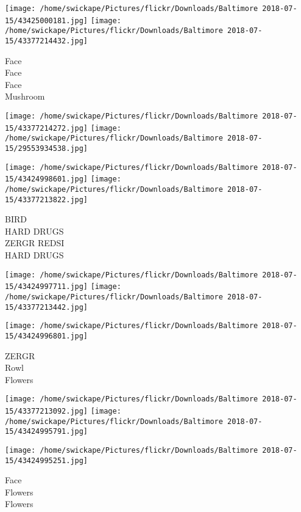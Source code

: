\documentclass[10pt,letterpaper]{article}
\begin{document}
\texttt{[image: /home/swickape/Pictures/flickr/Downloads/Baltimore 2018-07-15/43425000181.jpg]}
\texttt{[image: /home/swickape/Pictures/flickr/Downloads/Baltimore 2018-07-15/43377214432.jpg]}

Face\\
Face\\
Face\\
Mushroom\\
\pagebreak

\texttt{[image: /home/swickape/Pictures/flickr/Downloads/Baltimore 2018-07-15/43377214272.jpg]}
\texttt{[image: /home/swickape/Pictures/flickr/Downloads/Baltimore 2018-07-15/29553934538.jpg]}

\texttt{[image: /home/swickape/Pictures/flickr/Downloads/Baltimore 2018-07-15/43424998601.jpg]}
\texttt{[image: /home/swickape/Pictures/flickr/Downloads/Baltimore 2018-07-15/43377213822.jpg]}

BIRD\\
HARD DRUGS\\
ZERGR REDSI\\
HARD DRUGS\\
\pagebreak

\texttt{[image: /home/swickape/Pictures/flickr/Downloads/Baltimore 2018-07-15/43424997711.jpg]}
\texttt{[image: /home/swickape/Pictures/flickr/Downloads/Baltimore 2018-07-15/43377213442.jpg]}

\vspace{0.25in}
\texttt{[image: /home/swickape/Pictures/flickr/Downloads/Baltimore 2018-07-15/43424996801.jpg]}

ZERGR\\
Rowl\\
Flowers\\
\pagebreak

\texttt{[image: /home/swickape/Pictures/flickr/Downloads/Baltimore 2018-07-15/43377213092.jpg]}
\texttt{[image: /home/swickape/Pictures/flickr/Downloads/Baltimore 2018-07-15/43424995791.jpg]}

\vspace{0.25in}
\texttt{[image: /home/swickape/Pictures/flickr/Downloads/Baltimore 2018-07-15/43424995251.jpg]}

Face\\
Flowers\\
Flowers\\
\pagebreak
\end{document}
